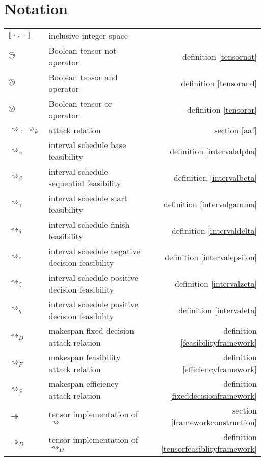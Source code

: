 
\chapter{Notation}

\begin{tabularx}{\textwidth}{l X r}
	$\intset{\ \cdot\ ,\ \cdot\ }$ & inclusive integer space & \\
	$\incircbin{\neg}$ & Boolean tensor not operator & definition \ref{tensornot} \\
	$\incircbin{\land}$ & Boolean tensor and operator & definition \ref{tensorand} \\
	$\incircbin{\lor}$ & Boolean tensor or operator & definition \ref{tensoror} \\
	$\rightsquigarrow,\rightsquigarrow_k$ & attack relation & section \ref{aaf}\\
	$\rightsquigarrow_\alpha$ & interval schedule base feasibility & definition \ref{intervalalpha} \\
	$\rightsquigarrow_\beta$ & interval schedule sequential feasibility & definition \ref{intervalbeta} \\
	$\rightsquigarrow_\gamma$ & interval schedule start feasibility & definition \ref{intervalgamma} \\
	$\rightsquigarrow_\delta$ & interval schedule finish feasibility & definition \ref{intervaldelta} \\
	$\rightsquigarrow_\varepsilon$ & interval schedule negative decision feasibility & definition \ref{intervalepsilon} \\
	$\rightsquigarrow_\zeta$ & interval schedule positive decision feasibility & definition \ref{intervalzeta} \\
	$\rightsquigarrow_\eta$ & interval schedule positive decision feasibility & definition \ref{intervaleta} \\
	$\rightsquigarrow_D$ & makespan fixed decision attack relation & definition \ref{feasibilityframework} \\
	$\rightsquigarrow_F$ & makespan feasibility attack relation & definition \ref{efficiencyframework} \\
	$\rightsquigarrow_S$ & makespan efficiency attack relation & definition \ref{fixeddecisionframework} \\
	$\twoheadrightarrow$ & tensor implementation of $\rightsquigarrow$ & section \ref{frameworkconstruction} \\
	$\twoheadrightarrow_D$ & tensor implementation of $\rightsquigarrow_D$ & definition \ref{tensorfeasiblityframework} \\

\end{tabularx}
